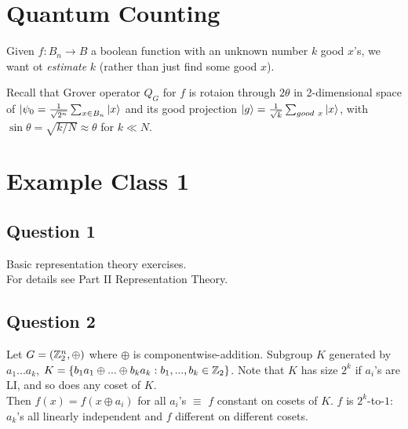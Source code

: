 \documentclass[a4paper]{article}
\begin{document}
\newpage

\section{Quantum Counting}

Given $f:B_n \to B$ a boolean function with an unknown number $k$ good $x$'s, we want ot \emph{estimate} $k$ (rather than just find some good $x$).

Recall that Grover operator $Q_G$ for $f$ is rotaion through $2\theta$ in 2-dimensional space of $|\psi_0 = \frac{1}{\sqrt{2^n}} \sum_{x \in B_n} |x\rangle$ and its good projection $|g\rangle = \frac{1}{\sqrt{k}} \sum_{good\ x} |x\rangle$, with $\sin\theta = \sqrt{k/N} \approx \theta$ for $k \ll N$.


\newpage

\section{Example Class 1}

\subsection{Question 1}
Basic representation theory exercises.\\
For details see Part II Representation Theory.

\subsection{Question 2}
Let $G=(\mathbb{Z}_2^n, \oplus)$ where $\oplus$ is componentwise-addition. Subgroup $K$ generated by $a_1...a_k$, $K=\{b_1a_1 \oplus ... \oplus b_ka_k:b_1,...,b_k \in \mathbb{Z}_2\}$. Note that $K$ has size $2^k$ if $a_i$'s are LI, and so does any coset of $K$.\\
Then $f(x) = f(x \oplus a_i)$ for all $a_i$'s $\equiv$ $f$ constant on cosets of $K$. $f$ is $2^k$-to-$1$: $a_k$'s all linearly independent and $f$ different on different cosets.
\end{document}
